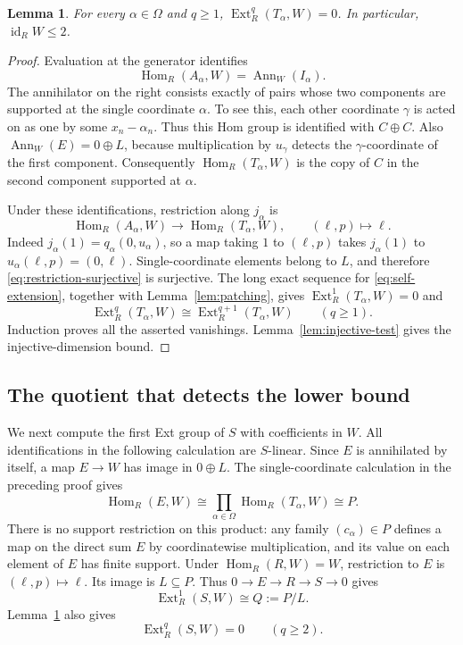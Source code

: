 \documentclass[11pt]{amsart}
\newtheorem{lemma}[theorem]{Lemma}
\theoremstyle{definition}
\DeclareMathOperator{\id}{id}
\DeclareMathOperator{\Hom}{Hom}
\DeclareMathOperator{\Ext}{Ext}
\DeclareMathOperator{\Ann}{Ann}
\numberwithin{equation}{section}
\begin{document}
\begin{lemma}\label{lem:W-upper}
For every $\alpha\in\Omega$ and $q\geq1$,
$\Ext_R^q(T_\alpha,W)=0$. In particular, $\id_R W\leq2$.
\end{lemma}

\begin{proof}
Evaluation at the generator identifies
\[
 \Hom_R(A_\alpha,W)=\Ann_W(I_\alpha).
\]
The annihilator on the right consists exactly of pairs whose two
components are supported at the single coordinate $\alpha$. To see
this, each other coordinate $\gamma$ is acted on as one by some
$x_n-\alpha_n$. Thus this Hom group is identified with $C\oplus C$.
Also $\Ann_W(E)=0\oplus L$, because multiplication by $u_\gamma$
detects the $\gamma$-coordinate of the first component. Consequently
$\Hom_R(T_\alpha,W)$ is the copy of $C$ in the second component
supported at $\alpha$.

Under these identifications, restriction along $j_\alpha$ is
\begin{equation}\label{eq:restriction-surjective}
 \Hom_R(A_\alpha,W)\longrightarrow\Hom_R(T_\alpha,W),
       \qquad(\ell,p)\longmapsto\ell.
\end{equation}
Indeed $j_\alpha(1)=q_\alpha(0,u_\alpha)$, so a map taking $1$ to
$(\ell,p)$ takes $j_\alpha(1)$ to
$u_\alpha(\ell,p)=(0,\ell)$. Single-coordinate elements belong to
$L$, and therefore \eqref{eq:restriction-surjective} is surjective.
The long exact sequence for \eqref{eq:self-extension}, together
with Lemma~\ref{lem:patching}, gives $\Ext_R^1(T_\alpha,W)=0$ and
\[
 \Ext_R^q(T_\alpha,W)\cong\Ext_R^{q+1}(T_\alpha,W)
       \qquad(q\geq1).
\]
Induction proves all the asserted vanishings.
Lemma~\ref{lem:injective-test} gives the injective-dimension bound.
\end{proof}

\subsection{The quotient that detects the lower bound}

We next compute the first Ext group of $S$ with coefficients in $W$.
All identifications in the following calculation are $S$-linear.
Since $E$ is annihilated by itself, a map $E\to W$ has image in
$0\oplus L$. The single-coordinate calculation in the preceding
proof gives
\[
 \Hom_R(E,W)\cong\prod_{\alpha\in\Omega}\Hom_R(T_\alpha,W)
                \cong P.
\]
There is no support restriction on this product: any family
$(c_\alpha)\in P$ defines a map on the direct sum $E$ by
coordinatewise multiplication, and its value on each element of $E$
has finite support. Under $\Hom_R(R,W)=W$, restriction to $E$ is
$(\ell,p)\mapsto\ell$. Its image is $L\subseteq P$. Thus
$0\to E\to R\to S\to0$ gives
\begin{equation}\label{eq:Q}
 \Ext_R^1(S,W)\cong Q:=P/L.
\end{equation}
Lemma~\ref{lem:W-upper} also gives
\begin{equation}\label{eq:SW-vanish}
 \Ext_R^q(S,W)=0\qquad(q\geq2).
\end{equation}
\end{document}
